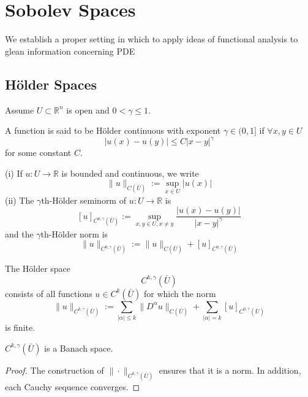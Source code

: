 \chapter{Sobolev Spaces}


We establish a proper setting in which to apply ideas of functional analysis to glean information concerning PDE


\section{H\"older Spaces}
Assume $U\subset \mathbb{R}^n$ is open and $0<\gamma\le 1$. 
\begin{definition}
    A function is said to be H\"older continuous with exponent $\gamma\in (0,1]$ if $\forall x,y\in U$
    \begin{equation}
        |u(x)-u(y)|\le C|x-y|^\gamma
    \end{equation}
    for some constant $C$.    
\end{definition}

\begin{definition}
    (i) If $u:U\to\mathbb{R}$ is bounded and continuous, we write 
    \[\|u\|_{C(\bar{U})}:=\sup_{x\in U}|u(x)|\] 
    (ii) The $\gamma$th-H\"older seminorm of $u:U\to\mathbb{R}$ is 
    \[[u]_{C^{0,\gamma}(\bar{U})}:=\sup_{x,y\in U,x\ne y} \frac{|u(x)-u(y)|}{|x-y|^\gamma}\] 
    and the $\gamma$th-H\"older norm is 
    \[\|u\|_{C^{0,\gamma}(\bar{U})}:= \|u\|_{C(\bar{U})}+[u]_{C^{0,\gamma}(\bar{U})}\]
\end{definition}

\begin{definition}
    The H\"older space \[C^{k,\gamma}(\bar{U})\] consists of all functions $u\in C^k(\bar{U})$ for which the norm 
    \[ \|u\|_{C^{k,\gamma}(\bar{U})}:= \sum_{|\alpha|\le k}\|D^\alpha u\|_{C(\bar{U})}+\sum_{|\alpha|= k}[u]_{C^{0,\gamma}(\bar{U})}\]
    is finite.
\end{definition}

\begin{theorem}
    $C^{k,\gamma}(\bar{U})$ is a Banach space.
\end{theorem}
\begin{proof}
    The construction of $\|\cdot\|_{C^{k,\gamma}(\bar{U})}$ ensures that it is a norm. 
    In addition, each Cauchy sequence converges.
\end{proof}



